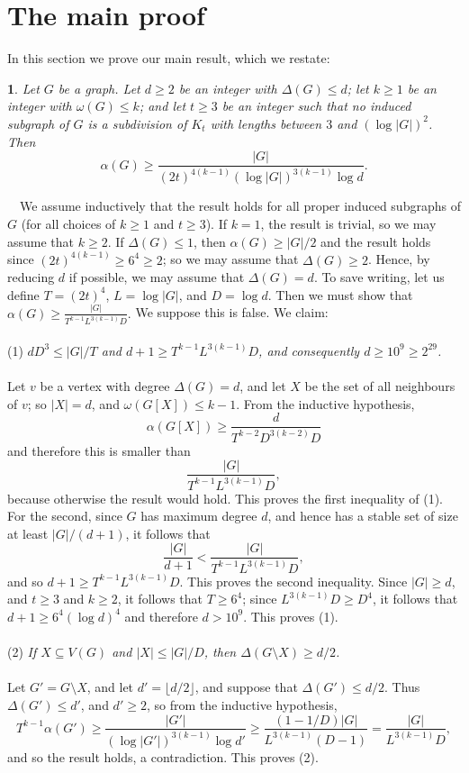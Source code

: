 \documentclass[titlepage,11pt]{article}
\newtheorem{thm}{}[section]
\newcommand{\Proof}{\noindent{\bf Proof.}\ \ }
\begin{document}
\section{The main proof}
In this section we prove our main result, which we restate:
\begin{thm} \label{subdivision}
Let $G$ be a graph. Let $d\ge 2$ be an integer with $\Delta(G)\le d$; let $k\ge 1$ be an integer with $\omega(G)\le k$; and let $t\ge 3$ be an integer 
such that no induced subgraph of $G$                                
is a subdivision of $K_t$ with lengths between $3$ and $(\log |G|)^2$.  Then 
$$\alpha(G)\ge \frac{|G|}{(2t)^{4(k-1)}(\log |G|)^{3(k-1)}\log d}.$$
\end{thm}
\Proof  We assume inductively that the result holds for all proper induced subgraphs of $G$ (for all choices of $k\ge 1$ and $t\ge 3$).
If $k=1$, the result is trivial, so we may assume that $k\ge 2$.
If $\Delta(G)\le 1$, then $\alpha(G)\ge |G|/2$
and the result holds since $(2t)^{4(k-1)}\ge 6^4\ge 2$; so we may assume that $\Delta(G)\ge 2$. Hence, by reducing $d$ 
if possible, we may assume that $\Delta(G)=d$.
To save writing, let us define $T=(2t)^4$,  $L=\log |G|$, and $D=\log d$. Then we must show that 
$\alpha(G)\ge \frac{|G|}{T^{k-1}L^{3(k-1)}D}.$ 
We suppose this is false.
We claim:
\\
\\
(1) {\em $d D^3\le |G|/T$ and $d+1\ge T^{k-1}L^{3(k-1)}D$, and consequently $d\ge 10^9\ge 2^{29}$.}
\\
\\
Let $v$ be a vertex with degree $\Delta(G)=d$, and let $X$ be the set of all neighbours of $v$; so $|X|=d$, 
and $\omega(G[X])\le k-1$. From the inductive hypothesis,
$$\alpha(G[X])\ge \frac{d}{T^{k-2}D^{3(k-2)}D}$$
and therefore this is smaller than 
$$\frac{|G|}{T^{k-1}L^{3(k-1)}D},$$
because otherwise the result would hold. This proves the first inequality of (1). 
For the second, 
since $G$ has maximum degree $d$, and hence has a stable set of size at least $|G|/(d+1)$,
it follows that 
$$\frac{|G|}{d+1}<\frac{|G|}{T^{k-1}L^{3(k-1)}D},$$
and so $d+1\ge T^{k-1}L^{3(k-1)}D$. This proves the second inequality. Since $|G|\ge d$, and $t\ge 3$ and $k\ge 2$,
it follows that $T\ge 6^4$; since $L^{3(k-1)}D \ge D^4$, it follows that $d+1\ge 6^4(\log d)^4$
and therefore $d>10^9$.
This proves (1).
\\
\\
(2) {\em If $X\subseteq V(G)$ and $|X|\le |G|/D$, then $\Delta(G\setminus X)\ge d/2$.}
\\
\\
Let $G'=G\setminus X$, and let $d'=\lfloor d/2\rfloor$, and suppose that $\Delta(G')\le d/2$. 
Thus $\Delta(G')\le d'$, and $d'\ge 2$, so from the inductive hypothesis,
$$T^{k-1}\alpha(G')\ge \frac{|G'|}{(\log |G'|)^{3(k-1)} \log d'}\ge 
\frac{(1-1/D)|G|}{L^{3(k-1)}(D - 1)}=\frac{|G|}{L^{3(k-1)}D},$$
and so the result holds, a contradiction. This proves (2).
\end{document}
